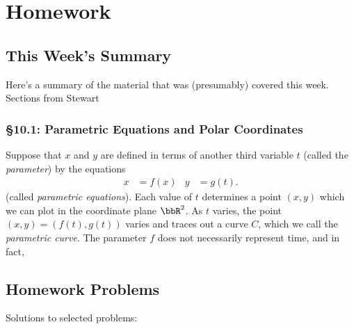 \chapter{Homework}
\section{This Week's Summary}
Here's a summary of the material that was (presumably) covered this week.
Sections from Stewart
\subsection{\S 10.1: Parametric Equations and Polar Coordinates}
Suppose that $x$ and $y$ are defined in terms of another third variable
$t$ (called the \emph{parameter}) by the equations
\[
\begin{aligned}
x&=f(x)&y&=g(t).
\end{aligned}
\]
(called \emph{parametric equations}). Each value of $t$ determines a point
$(x,y)$ which we can plot in the coordinate plane $\bbR^2$. As $t$ varies,
the point $(x,y)=(f(t),g(t))$ varies and traces out a curve $C$, which we
call the \emph{parametric curve}. The parameter $f$ does not necessarily
represent time, and in fact,

\section{Homework Problems}
Solutions to selected problems:
